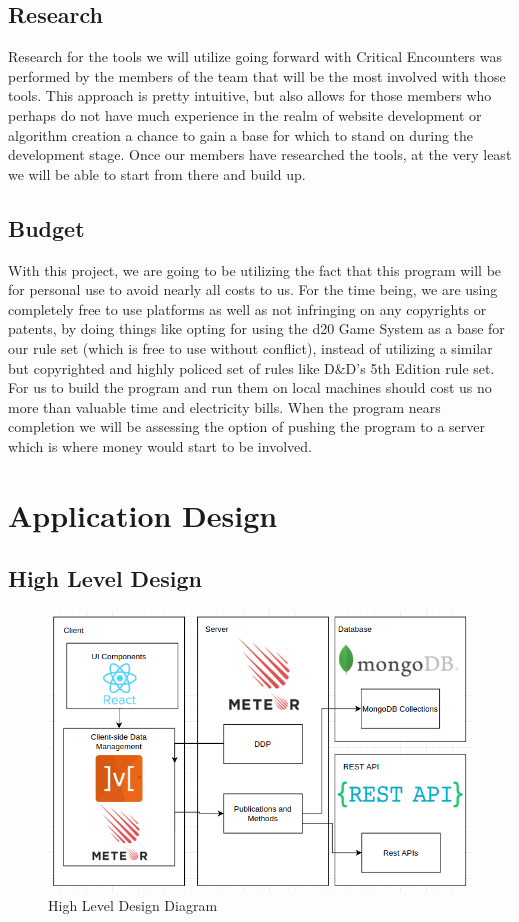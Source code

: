 \documentclass[12pt,a4paper]{report}
\begin{document}
	\section{Research}
	Research for the tools we will utilize going forward with Critical Encounters was performed by the members of the team that will be the most involved with those tools. This approach is pretty intuitive, but also allows for those members who perhaps do not have much experience in the realm of website development or algorithm creation a chance to gain a base for which to stand on during the development stage. Once our members have researched the tools, at the very least we will be able to start from there and build up.
	\section{Budget}
	With this project, we are going to be utilizing the fact that this program will be for personal use to avoid nearly all costs to us. For the time being, we are using completely free to use platforms as well as not infringing on any copyrights or patents, by doing things like opting for using the d20 Game System as a base for our rule set (which is free to use without conflict), instead of utilizing a similar but copyrighted and highly policed set of rules like D\&D's 5th Edition rule set. For us to build the program and run them on local machines should cost us no more than valuable time and electricity bills. When the program nears completion we will be assessing the option of pushing the program to a server which is where money would start to be involved.
	
\newpage
\chapter*{Application Design}
	\section {High Level Design}
		\begin{figure}[H]
			\centering
			\includegraphics[scale=.5]{designsd.png}
			\caption{High Level Design Diagram}
			\label{fig: High Level Design}
		\end{figure}
		
\end{document}

